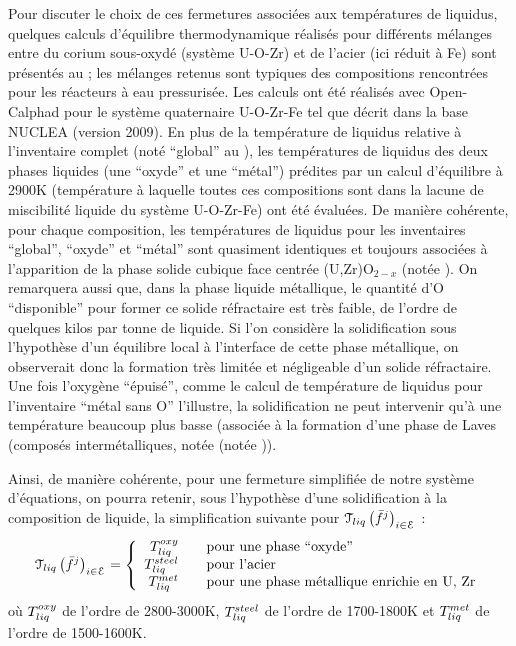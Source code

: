 Pour discuter le choix de ces fermetures associées aux températures de liquidus, quelques calculs d'équilibre thermodynamique réalisés pour différents mélanges entre du corium sous-oxydé (système U-O-Zr) et de l'acier (ici réduit à Fe) sont présentés au  ; les mélanges retenus sont typiques des compositions rencontrées pour les réacteurs à eau pressurisée. Les calculs ont été réalisés avec Open-Calphad \cite{Sundman2015,Sundman2016} pour le système quaternaire U-O-Zr-Fe tel que décrit dans la base NUCLEA \cite{Cheynet2002} (version 2009). En plus de la température de liquidus relative à l'inventaire complet (noté ``global'' au ), les températures de liquidus des deux phases liquides (une ``oxyde'' et une ``métal'') prédites par un calcul d'équilibre à 2900K (température à laquelle toutes ces compositions sont dans la lacune de miscibilité liquide du système U-O-Zr-Fe) ont été évaluées. De manière cohérente, pour chaque composition, les températures de liquidus pour les inventaires ``global'', ``oxyde'' et ``métal'' sont quasiment identiques et toujours associées à l'apparition de la phase solide cubique face centrée (U,Zr)O$_{2-x}$ (notée ). On remarquera aussi que, dans la phase liquide métallique, le quantité d'O ``disponible'' pour former ce solide réfractaire est très faible, de l'ordre de quelques kilos par tonne de liquide. Si l'on considère la solidification sous l'hypothèse d'un équilibre local à l'interface de cette phase métallique, on observerait donc la formation très limitée et négligeable d'un solide réfractaire. Une fois l'oxygène ``épuisé'', comme le calcul de température de liquidus pour l'inventaire ``métal sans O'' l'illustre, la solidification ne peut intervenir qu'à une température beaucoup plus basse (associée à la formation d'une phase de Laves (composés intermétalliques, notée (notée )).

Ainsi, de manière cohérente, pour une fermeture simplifiée de notre système d'équations, on pourra retenir, sous l'hypothèse d'une solidification à la composition de liquide, la simplification suivante pour $\Mc{T}_{liq}\left(\elementMassFraction[j]{}\right)_{i\in\elementSet}$ :
\begin{equation}
 \Mc{T}_{liq}\left(\elementMassFraction[j]{}\right)_{i\in\elementSet} = 
 \left\{\begin{array}{rcl} \temperature[oxy]{liq} & & \text{pour une phase ``oxyde''} \\
                           \temperature[steel]{liq} & & \text{pour l'acier} \\
                           \temperature[met]{liq} & & \text{pour une phase métallique enrichie en U, Zr} 
 \end{array}\right.
\end{equation}
où $\temperature[oxy]{liq}$ de l'ordre de 2800-3000K, $\temperature[steel]{liq}$ de l'ordre de 1700-1800K et $\temperature[met]{liq}$ de l'ordre de 1500-1600K.

